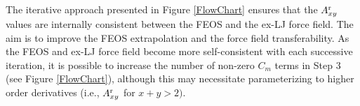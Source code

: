 \documentclass[12pt,a4paper]{article}
\begin{document}






The iterative approach presented in Figure \ref{FlowChart} ensures that the $A_{xy}^{\rm r}$ values are internally consistent between the FEOS and the ex-LJ force field. The aim is to improve the FEOS extrapolation and the force field transferability. As the FEOS and ex-LJ force field become more self-consistent with each successive iteration, it is possible to increase the number of non-zero $C_m$ terms in Step 3 (see Figure \ref{FlowChart}), although this may necessitate parameterizing to higher order derivatives (i.e., $A_{xy}^{\rm r}$ for $x+y>2)$.
\end{document}
